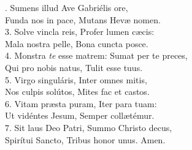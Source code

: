 . Sumens illud Ave Gabriélis ore,\\
Funda nos in pace, Mutans Hevæ nomen.\\

3. Solve vincla reis, Profer lumen cæcis:\\
Mala nostra pelle, Bona cuncta posce.\\

4. Monstra \textit{te} esse matrem: Sumat per te preces,\\
Qui pro nobis natus, Tulit esse tuus.\\

5. Virgo singuláris, Inter omnes mitis,\\
Nos culpis solútos, Mites fac et castos.\\

6. Vitam præsta puram, Iter para tuam:\\
Ut vidéntes Jesum, Semper collætémur.\\

7. Sit laus Deo Patri, Summo Christo decus,\\
Spirítui Sancto, Tribus honor unus. Amen.\\
